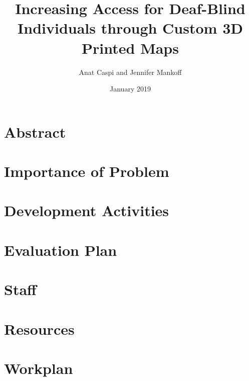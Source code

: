 \documentclass[12pt,letterpaper]{article}
\title{Increasing Access for Deaf-Blind Individuals through Custom 3D Printed Maps}
\author{Anat Caspi and Jennifer Mankoff}
\date{January 2019}
\begin{document}
\maketitle
\thispagestyle{empty}

\tableofcontents
\clearpage
\section*{Abstract}
{

\normalsize

}

\clearpage
{} 

%
\section{Importance of Problem}

\section{Development Activities}

%
\section{Evaluation Plan}


\section{Staff}

\section{Resources}

\section{Workplan}

\end{document}

